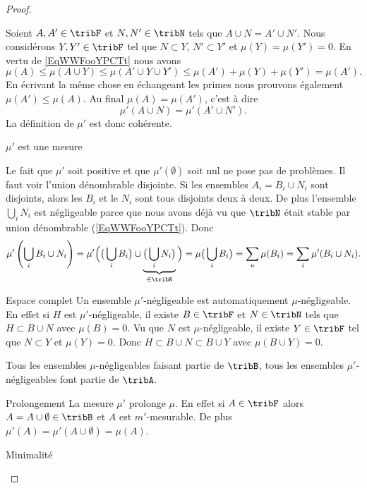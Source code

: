 \begin{proof}
\begin{subproof}
            Soient \( A,A'\in\tribF\) et \( N,N'\in\tribN\) tels que \( A\cup N=A'\cup N'\). Nous considérons \( Y,Y'\in\tribF\) tel que \( N\subset Y\), \( N'\subset Y'\) et \( \mu(Y)=\mu(Y')=0\). En vertu de \eqref{EqWWFooYPCTt} nous avons
            \begin{equation}
                \mu(A)\leq \mu(A\cup Y)\leq \mu(A'\cup Y\cup Y')\leq\mu(A')+\mu(Y)+\mu(Y')=\mu(A').
            \end{equation}
            En écrivant la même chose en échangeant les primes nous prouvons également \( \mu(A')\leq \mu(A)\). Au final \( \mu(A)=\mu(A')\), c'est à dire
            \begin{equation}
                \mu'(A\cup N)=\mu'(A'\cup N').
            \end{equation}
            La définition de \( \mu'\) est donc cohérente.
        \item[\( \mu'\) est une mesure]

            Le fait que \( \mu'\) soit positive et que \( \mu'(\emptyset)\) soit nul ne pose pas de problèmes. Il faut voir l'union dénombrable disjointe. Si les ensembles \( A_i=B_i\cup N_i\) sont disjoints, alors les \( B_i\) et le \( N_i\) sont tous disjoints deux à deux. De plus l'ensemble \( \bigcup_iN_i\) est négligeable parce que nous avons déjà vu que \( \tribN\) était stable par union dénombrable (\ref{EqWWFooYPCTt}). Donc
            \begin{equation}
                \mu'\left( \bigcup_i B_i\cup N_i \right)=\mu'\Big( \big( \bigcup_iB_i \big)\cup\underbrace{\big( \bigcup_iN_i \big)}_{\in\tribN} \Big)=\mu\big( \bigcup_iB_i \big)=\sum_u\mu(B_i)=\sum_i\mu'(B_i\cup N_i).
            \end{equation}
        \item[Espace complet]
            Un ensemble \( \mu'\)-négligeable est automatiquement \( \mu\)-négligeable. En effet si \( H\) est \( \mu'\)-négligeable, il existe \( B\in\tribF\) et \( N\in\tribN\) tels que \( H\subset B\cup N\) avec \( \mu(B)=0\). Vu que \( N\) est \( \mu\)-négligeable, il existe \( Y\in\tribF\) tel que \( N\subset Y\) et \( \mu(Y)=0\). Donc \( H\subset B\cup N\subset B\cup Y\) avec \( \mu(B\cup Y)=0\).

            Tous les ensembles \( \mu\)-négligeables faisant partie de \( \tribB\), tous les ensembles \( \mu'\)-négligeables font partie de \( \tribA\).
        \item[Prolongement]
            La mesure \( \mu'\) prolonge \( \mu\). En effet si \( A\in\tribF\) alors \( A=A\cup\emptyset\in\tribB\) et \( A\) est \( m'\)-mesurable. De plus \( \mu'(A)=\mu'(A\cup\emptyset)=\mu(A)\).
        \item[Minimalité]


\end{subproof}
\end{proof}
